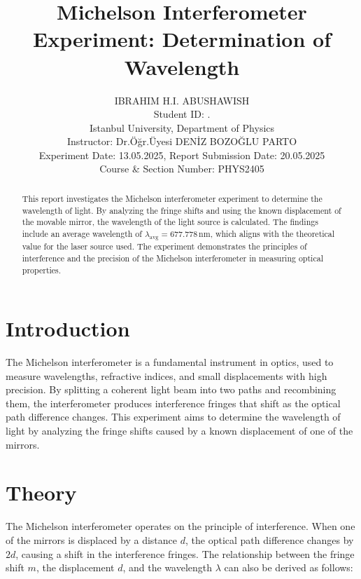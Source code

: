 \documentclass[journal]{IEEEtran}
\begin{document}
\title{Michelson Interferometer Experiment: Determination of Wavelength}
\author{IBRAHIM H.I. ABUSHAWISH \\

{\small Student ID: \hspace{1.5cm}. \\ 
Istanbul University, Department of Physics \\
Instructor: Dr.Öğr.Üyesi DENİZ BOZOĞLU PARTO\\
Experiment Date: 13.05.2025, Report Submission Date: 20.05.2025 \\
Course \& Section Number: PHYS2405}}


\maketitle
\begin{abstract}
    This report investigates the Michelson interferometer experiment to determine the wavelength of light. By analyzing the fringe shifts and using the known displacement of the movable mirror, the wavelength of the light source is calculated. The findings include an average wavelength of \( \lambda_{\text{avg}} = 677.778 \, \text{nm} \), which aligns with the theoretical value for the laser source used. The experiment demonstrates the principles of interference and the precision of the Michelson interferometer in measuring optical properties.
\end{abstract}

\section{Introduction}
The Michelson interferometer is a fundamental instrument in optics, used to measure wavelengths, refractive indices, and small displacements with high precision. By splitting a coherent light beam into two paths and recombining them, the interferometer produces interference fringes that shift as the optical path difference changes. This experiment aims to determine the wavelength of light by analyzing the fringe shifts caused by a known displacement of one of the mirrors.

\section*{Theory}
The Michelson interferometer operates on the principle of interference. When one of the mirrors is displaced by a distance \( d \), the optical path difference changes by \( 2d \), causing a shift in the interference fringes. The relationship between the fringe shift \( m \), the displacement \( d \), and the wavelength \( \lambda \) can also be derived as follows:
\end{document}
